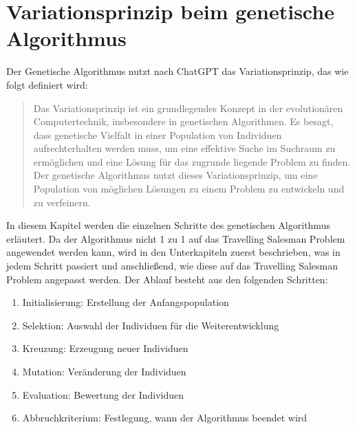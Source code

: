 %
%
%
%
\section{Variationsprinzip beim genetische Algorithmus
\label{buch:paper:varalg:section:genetic_algorithm_process}}
Der Genetische Algorithmus nutzt nach ChatGPT das Variationsprinzip, 
das wie folgt definiert wird:
\begin{quote}
Das Variationsprinzip ist ein grundlegendes Konzept in der 
evolutionären Computertechnik, insbesondere in genetischen 
Algorithmen. Es besagt, dass genetische Vielfalt in einer 
Population von Individuen aufrechterhalten werden muss, 
um eine effektive Suche im Suchraum zu ermöglichen und eine 
Lösung für das zugrunde liegende Problem zu finden.
\\
Der genetische Algorithmus nutzt dieses Variationsprinzip, um eine 
Population von möglichen Lösungen zu einem Problem zu entwickeln 
und zu verfeinern\cite{chatgpt2024}.
\end{quote}
In diesem Kapitel werden die einzelnen Schritte des genetischen Algorithmus 
erläutert. Da der Algorithmus nicht 1 zu 1 auf das Travelling Salesman
Problem angewendet werden kann, wird in den Unterkapiteln zuerst beschrieben,
was in jedem Schritt passiert und anschließend, wie diese auf das Travelling 
Salesman Problem angepasst werden.
Der Ablauf besteht aus den folgenden Schritten:
\begin{enumerate}
    \item Initialisierung: Erstellung der Anfangspopulation
    \item Selektion: Auswahl der Individuen für die Weiterentwicklung
    \item Kreuzung: Erzeugung neuer Individuen
    \item Mutation: Veränderung der Individuen
    \item Evaluation: Bewertung der Individuen
    \item Abbruchkriterium: Festlegung, wann der Algorithmus beendet wird
\end{enumerate}









